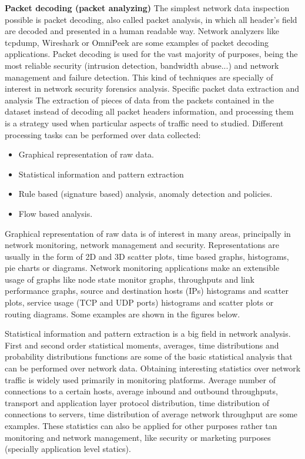 \documentclass[thesis=M,english]{FITthesis}[2011/07/15]
\begin{document}
\textbf{Packet decoding (packet analyzing)}
The simplest network data inspection possible is packet decoding, also called packet analysis, in which all header’s field are decoded and presented in a human readable way. Network analyzers like tcpdump, Wireshark or OmniPeek are some examples of packet decoding applications.
Packet decoding is used for the vast majority of purposes, being the most reliable security (intrusion detection, bandwidth abuse...) and network management and failure detection.
This kind of techniques are specially of interest in network security forensics analysis. Specific packet data extraction and analysis The extraction of pieces of data from the packets contained in the dataset instead of decoding all packet headers information, and processing them is a strategy used when particular aspects of traffic need to studied.
Different processing tasks can be performed over data collected:
\begin{itemize}
\item Graphical representation of raw data.
\item Statistical information and pattern extraction
\item Rule based (signature based) analysis, anomaly detection and policies.
\item Flow based analysis.
\end{itemize}
Graphical representation of raw data is of interest in many areas, principally in network monitoring, network management and security. Representations are usually in the form of 2D and 3D scatter plots, time based graphs, histograms, pie charts or diagrams. Network monitoring applications make an extensible usage of graphs like node state monitor graphs, throughputs and link performance graphs, source and destination hosts (IPs) histograms and scatter plots, service usage (TCP and UDP ports) histograms and scatter plots or routing diagrams. Some examples are shown in the figures below.

Statistical information and pattern extraction is a big field in network analysis. First and second order statistical moments, averages, time distributions and probability distributions functions are some of the basic statistical analysis that can be performed over network data. 
Obtaining interesting statistics over network traffic is widely used primarily in monitoring platforms. Average number of connections to a certain hosts, average inbound and outbound throughputs, transport and application layer protocol distribution, time distribution of connections to servers, time distribution of average network throughput are some examples. These statistics can also be applied for other purposes rather tan monitoring and network management, like security or marketing purposes (specially application level statics).
\end{document}
